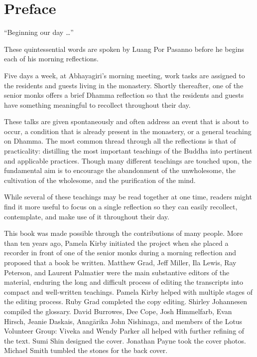 \chapter*{Preface}

``Beginning our day \ldots{}''

These quintessential words are spoken by Luang Por Pasanno before he
begins each of his morning reflections.

Five days a week, at Abhayagiri's morning meeting, work tasks are
assigned to the residents and guests living in the monastery. Shortly
thereafter, one of the senior monks offers a brief Dhamma reflection so
that the residents and guests have something meaningful to recollect
throughout their day.

These talks are given spontaneously and often address an event that is
about to occur, a condition that is already present in the monastery, or
a general teaching on Dhamma. The most common thread through all the
reflections is that of practicality: distilling the most important
teachings of the Buddha into pertinent and applicable practices. Though
many different teachings are touched upon, the fundamental aim is to
encourage the abandonment of the unwholesome, the cultivation of the
wholesome, and the purification of the mind.

While several of these teachings may be read together at one time,
readers might find it more useful to focus on a single reflection so
they can easily recollect, contemplate, and make use of it throughout
their day.

This book was made possible through the contributions of many people.
More than ten years ago, Pamela Kirby initiated the project when she
placed a recorder in front of one of the senior monks during a morning
reflection and proposed that a book be written. Matthew Grad, Jeff
Miller, Ila Lewis, Ray Peterson, and Laurent Palmatier were the main
substantive editors of the material, enduring the long and difficult
process of editing the transcripts into compact and well-written
teachings. Pamela Kirby helped with multiple stages of the editing
process. Ruby Grad completed the copy editing. Shirley Johannesen
compiled the glossary. David Burrowes, Dee Cope, Josh Himmelfarb, Evan
Hirsch, Jeanie Daskais, Anagārika John Nishinaga, and members of the
Lotus Volunteer Group: Viveka and Wendy Parker all helped with further
refining of the text. Sumi Shin designed the cover. Jonathan Payne took
the cover photos. Michael Smith tumbled the stones for the back cover.


